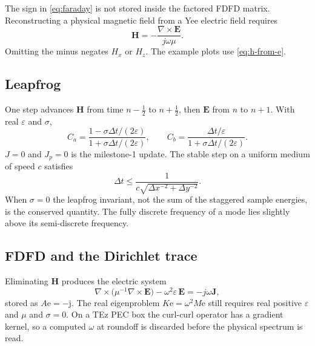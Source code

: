 \documentclass[11pt,a4paper]{article}
\begin{document}
The sign in \eqref{eq:faraday} is not stored inside the factored FDFD
matrix. Reconstructing a physical magnetic field from a Yee electric field
requires
\begin{equation}
\mathbf{H} = -\frac{\nabla\times\mathbf{E}}{j\omega\mu}.
\label{eq:h-from-e}
\end{equation}
Omitting the minus negates $H_x$ or $H_z$. The example plots use
\eqref{eq:h-from-e}.

\subsection{Leapfrog}
\label{sec:leapfrog}

One step advances $\mathbf{H}$ from time $n-\tfrac12$ to $n+\tfrac12$, then
$\mathbf{E}$ from $n$ to $n+1$. With real $\varepsilon$ and $\sigma$,
\begin{equation}
C_a = \frac{1-\sigma\Delta t/(2\varepsilon)}{1+\sigma\Delta t/(2\varepsilon)},
\qquad
C_b = \frac{\Delta t/\varepsilon}{1+\sigma\Delta t/(2\varepsilon)}.
\label{eq:ca-cb}
\end{equation}
$J=0$ and $J_p=0$ is the milestone-1 update. The stable step on a uniform
medium of speed $c$ satisfies
\begin{equation}
\Delta t \le \frac{1}{c\sqrt{\Delta x^{-2}+\Delta y^{-2}}}.
\label{eq:cfl}
\end{equation}
When $\sigma=0$ the leapfrog invariant, not the sum of the staggered sample
energies, is the conserved quantity. The fully discrete frequency of a mode
lies slightly above its semi-discrete frequency.

\subsection{FDFD and the Dirichlet trace}
\label{sec:fdfd}

Eliminating $\mathbf{H}$ produces the electric system
\begin{equation}
\nabla\times\big(\mu^{-1}\nabla\times\mathbf{E}\big)
- \omega^2\varepsilon\,\mathbf{E}
= -j\omega\mathbf{J},
\label{eq:fdfd-strong}
\end{equation}
stored as $A\mathrm{e}=-\mathrm{j}$. The real eigenproblem
$K\mathrm{e}=\omega^2 M\mathrm{e}$ still requires real positive
$\varepsilon$ and $\mu$ and $\sigma=0$. On a TEz PEC box the curl-curl
operator has a gradient kernel, so a computed $\omega$ at roundoff is
discarded before the physical spectrum is read.
\end{document}
